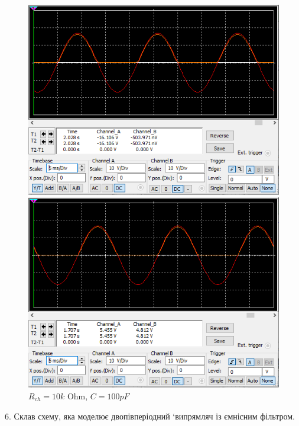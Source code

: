 \documentclass{article}
\begin{document}
\begin{normalsize}
		\begin{figure}[H]
		\begin{minipage}[t]{0.48\textwidth}
			\centering
			\includegraphics[width=\textwidth]{55}
			\caption{$R_{ch}=500\text{ Ohm}$, $C=100pF$}
		\end{minipage}
		\hfill
		\begin{minipage}[t]{0.48\textwidth}
			\centering
			\includegraphics[width=\textwidth]{56}
			\caption{$R_{ch}=10k\text{ Ohm}$, $C=100pF$}
		\end{minipage}
	\end{figure}
	
	6.  Склав схему, яка моделює двопівперіодний ‘випрямляч із ємнісним фільтром.
	

\end{normalsize}
\end{document}
